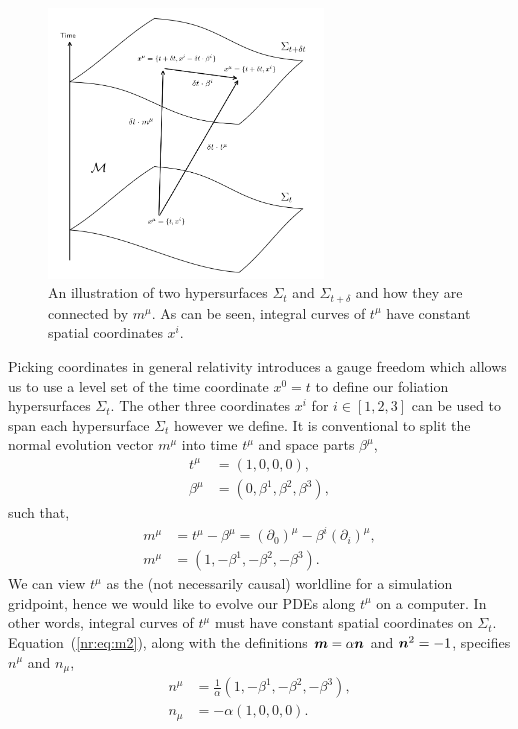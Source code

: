 \begin{figure}[h!]
    \includegraphics[width=0.65\textwidth]{png/ADM_screeny.png}
    \caption{An illustration of two hypersurfaces $\Sigma_t$ and $\Sigma_{t+\delta}$ and how they are connected by $m^\mu$. As can be seen, integral curves of $t^\mu$ have constant spatial coordinates $x^i$.  }
\end{figure}
Picking coordinates in general relativity introduces a gauge freedom which allows us to use a level set of the time coordinate $x^0=t$ to define our foliation hypersurfaces $\Sigma_t$. The other three coordinates $x^i$ for $i\in[1,2,3]$ can be used to span each hypersurface $\Sigma_t$ however we define. It is conventional to split the normal evolution vector $m^\mu$ into time $t^\mu$ and space parts $\beta^\mu$,
\begin{align}
\label{nr:eq:tmu} t^\mu &= \left( 1,0,0,0\right), \\
\label{nr:eq:betamu} \beta^\mu &= \left( 0,\beta^1,\beta^2,\beta^3\right), 
\end{align}
such that,
\begin{align}
\label{nr:eq:m1} m^\mu &= t^\mu - \beta^\mu  = (\partial_0)^\mu - \beta^i (\partial_i)^\mu, \\
\label{nr:eq:m2} m^\mu &= \left( 1,-\beta^1,-\beta^2,-\beta^3\right). 
\end{align}
We can view $t^\mu$ as the (not necessarily causal) worldline for a simulation gridpoint, hence we would like to evolve our PDEs along $t^\mu$ on a computer. In other words, integral curves of $t^\mu$ must have constant spatial coordinates on $\Sigma_t$. Equation~(\ref{nr:eq:m2}), along with the definitions $\boldsymbol{m} = \alpha \boldsymbol{n}$ and $\boldsymbol{n}^2=-1$, specifies $n^\mu$ and $n_\mu$,
\begin{align} 
n^\mu &=  \frac{1}{\alpha}\left( 1,-\beta^1,-\beta^2,-\beta^3\right),\\  
n_\mu &= -\alpha\left( 1,0,0,0\right).
\end{align}
